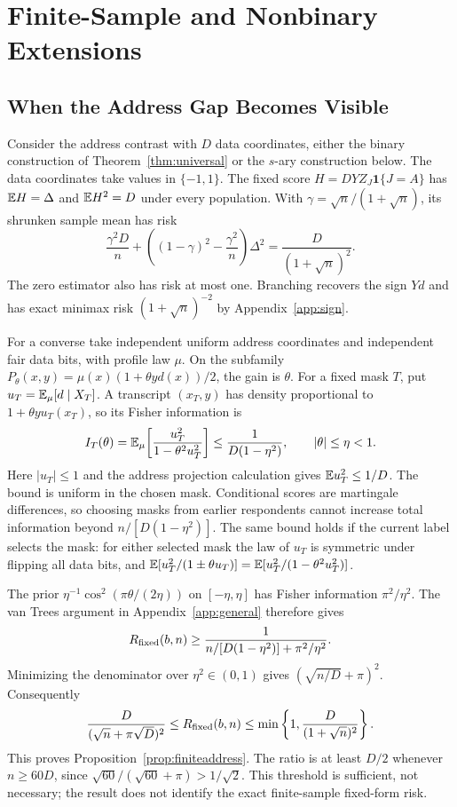 \section{Finite-Sample and Nonbinary Extensions}\label{app:extensions}
\subsection{When the Address Gap Becomes Visible}\label{app:addressfinite}
Consider the address contrast with $D$ data coordinates, either the binary construction of Theorem~\ref{thm:universal} or the $s$-ary construction below. The data coordinates take values in $\{-1,1\}$. The fixed score $H=DYZ_J\mathbf1\{J=A\}$ has $\mathbb{E} H=\Delta$ and $\mathbb{E} H^2=D$ under every population. With $\gamma=\sqrt n/(1+\sqrt n)$, its shrunken sample mean has risk
\[
 \frac{\gamma^2D}{n}+\left((1-\gamma)^2-\frac{\gamma^2}{n}\right)\Delta^2
   =\frac{D}{(1+\sqrt n)^2}.
\]
The zero estimator also has risk at most one. Branching recovers the sign $Yd$ and has exact minimax risk $(1+\sqrt n)^{-2}$ by Appendix~\ref{app:sign}.

For a converse take independent uniform address coordinates and independent fair data bits, with profile law $\mu$. On the subfamily $P_\theta(x,y)=\mu(x)(1+\theta y d(x))/2$, the gain is $\theta$. For a fixed mask $T$, put $u_T=\mathbb{E}_\mu[d\mid X_T]$. A transcript $(x_T,y)$ has density proportional to $1+\theta y u_T(x_T)$, so its Fisher information is
\[
 I_T(\theta)=\mathbb{E}_\mu\!\left[\frac{u_T^2}{1-\theta^2u_T^2}\right]
 \le\frac{1}{D(1-\eta^2)},\qquad |\theta|\le\eta<1.
\]
Here $|u_T|\le1$ and the address projection calculation gives $\mathbb{E} u_T^2\le1/D$. The bound is uniform in the chosen mask. Conditional scores are martingale differences, so choosing masks from earlier respondents cannot increase total information beyond $n/[D(1-\eta^2)]$. The same bound holds if the current label selects the mask: for either selected mask the law of $u_T$ is symmetric under flipping all data bits, and $\mathbb{E}[u_T^2/(1\pm\theta u_T)]=\mathbb{E}[u_T^2/(1-\theta^2u_T^2)]$.

The prior $\eta^{-1}\cos^2(\pi\theta/(2\eta))$ on $[-\eta,\eta]$ has Fisher information $\pi^2/\eta^2$. The van Trees argument in Appendix~\ref{app:general} therefore gives
\[
 R_{\rm fixed}(b,n)\ge
 \frac{1}{n/[D(1-\eta^2)]+\pi^2/\eta^2}.
\]
Minimizing the denominator over $\eta^2\in(0,1)$ gives $(\sqrt{n/D}+\pi)^2$. Consequently
\[
 \frac{D}{(\sqrt n+\pi\sqrt D)^2}
 \le R_{\rm fixed}(b,n)
 \le\min\left\{1,\frac{D}{(1+\sqrt n)^2}\right\}.
\]
This proves Proposition~\ref{prop:finiteaddress}. The ratio is at least $D/2$ whenever $n\ge60D$, since $\sqrt{60}/(\sqrt{60}+\pi)>1/\sqrt2$. This threshold is sufficient, not necessary; the result does not identify the exact finite-sample fixed-form risk.

